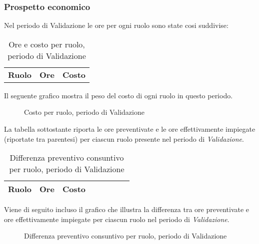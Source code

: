 	\subsubsection{Prospetto economico}

	Nel periodo di Validazione le ore per ogni ruolo sono state cosi suddivise:

	\begin{table}[H]
	\centering
	\begin{tabular}{ l c c }
		\textbf{Ruolo} & \textbf{Ore} & \textbf{Costo} \\
		
	\end{tabular}
	\caption{Ore e costo per ruolo, periodo di Validazione}
	\end{table}

	Il seguente grafico mostra il peso del costo di ogni ruolo in questo periodo.

	\begin{figure}[H]
	\begin{tikzpicture}
		
	\end{tikzpicture}
	\caption{Costo per ruolo, periodo di Validazione}
	\end{figure}

	La tabella sottostante riporta le ore preventivate e le ore effettivamente impiegate (riportate tra parentesi) per ciascun ruolo presente nel periodo di \textit{Validazione}.

	\begin{table}[H]
	\centering
	\begin{tabular}{lccccccc}
	\toprule
	    \textbf{Ruolo}  & \textbf{Ore} & \textbf{Costo} \\
	    \midrule
	    
	    \bottomrule
	\end{tabular}
	\caption{Differenza preventivo consuntivo per ruolo, periodo di Validazione}
	\end{table}

	Viene di seguito incluso il grafico che illustra la differenza tra ore preventivate e ore effettivamente impiegate per ciascun ruolo nel periodo di \textit{Validazione}.

	\begin{figure}[H]
	\centering
	\caption{Differenza preventivo consuntivo per ruolo, periodo di Validazione}
	\end{figure}